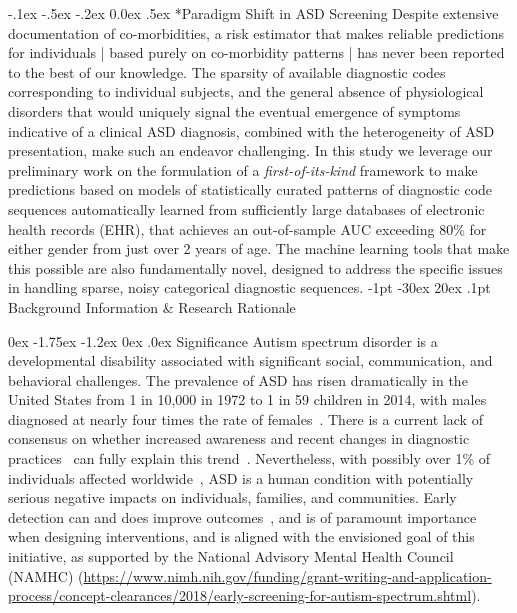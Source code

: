 \documentclass[onecolumn, compsoc,11pt]{IEEEtran}
\makeatletter
\renewcommand\section{\@startsection {section}{1}{\z@}%
                                   {-1pt \@plus -30ex \@minus 20ex}%
                                   {.1pt}%
                                   {\large\bfseries\scshape}}
\renewcommand\subsection{\@startsection {subsection}{2}{\z@}%
                                   {0ex \@plus -1.75ex \@minus -1.2ex}%
                                   {0ex \@plus.0ex}%
                                   {\fontsize{11}{11}\selectfont\bfseries\sffamily\color{black}}}
\renewcommand\paragraph{\@startsection {section}{1}{\z@}%
                                   {-.1ex \@plus -.5ex \@minus -.2ex}%
                                   {0.0ex \@plus.5ex}%
                                   {\fontsize{11}{10}\selectfont\bfseries\itshape\sffamily\color{black}}}
\makeatother
\begin{document}
\paragraph*{Paradigm Shift in ASD Screening} Despite extensive documentation of co-morbidities,   a risk estimator that makes reliable predictions for  individuals | based purely on co-morbidity patterns |  has never been reported to the best of our knowledge. The sparsity of available diagnostic codes corresponding to 
individual subjects, and the general absence of physiological disorders  that would uniquely signal the eventual emergence of symptoms indicative of a clinical ASD diagnosis, combined with the heterogeneity of ASD presentation,  make such an endeavor challenging. In this study we leverage our preliminary work on  the  formulation of a \textit{first-of-its-kind}  framework to make predictions 
based on models of statistically curated patterns of diagnostic code sequences automatically learned from  sufficiently large databases of electronic health records (EHR), that  achieves an out-of-sample AUC exceeding  $80\%$ for  either gender from just over 2 years of age. The machine learning tools that make this possible are also fundamentally novel, designed to address the specific issues in handling sparse, noisy categorical diagnostic sequences. 
\section{Background Information \& Research Rationale}
\parskip=8pt
\setcounter{page}{1}

\subsection{Significance}
Autism spectrum disorder is a developmental disability associated with significant social, communication, and behavioral challenges.  The prevalence of ASD  has risen dramatically in the United States from 1 in 10,000 in
 1972 to 1 in 59 children in 2014, with males  diagnosed at nearly four times the rate of females~\cite{pmid29701730,cdc}.
There is a current lack of   consensus on whether increased awareness and recent changes in diagnostic practices~\cite{hyman2020identification} can fully explain this  trend~\cite{pmid19737791}. Nevertheless, with   possibly  over 1\% of individuals affected worldwide~\cite{pmid22495912},  ASD is  a human condition with potentially serious negative impacts on individuals, families, and communities. 
Early detection can and does improve outcomes~\cite{hyman2020identification}, and is of paramount importance when designing interventions, and is aligned with the  envisioned goal of this initiative, as supported by the National Advisory Mental Health Council (NAMHC) (\href{https://www.nimh.nih.gov/funding/grant-writing-and-application-process/concept-clearances/2018/early-screening-for-autism-spectrum.shtml}{https://www.nimh.nih.gov/funding/grant-writing-and-application-process/concept-clearances/2018/early-screening-for-autism-spectrum.shtml}).
\end{document}
